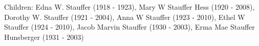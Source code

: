 Children: Edna W. Stauffer (1918 - 1923), Mary W Stauffer Hess (1920 - 2008), Dorothy W. Stauffer (1921 - 2004), Anna W Stauffer (1923 - 2010), Ethel W Stauffer (1924 - 2010), Jacob Marvin Stauffer (1930 - 2003), Erma Mae Stauffer Hunsberger (1931 - 2003)





